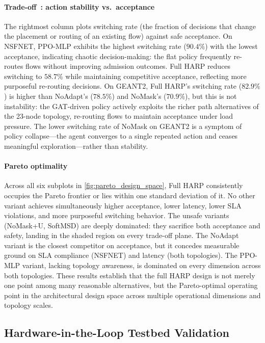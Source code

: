\documentclass[final,5p]{elsarticle}
\begin{document}
\paragraph{Trade-off~: action stability vs.\ acceptance}
The rightmost column plots switching rate (the fraction of decisions that change the placement or routing of an existing flow) against safe acceptance. On NSFNET, PPO-MLP exhibits the highest switching rate ($90.4\%$) with the lowest acceptance, indicating chaotic decision-making: the flat policy frequently re-routes flows without improving admission outcomes. Full HARP reduces switching to $58.7\%$ while maintaining competitive acceptance, reflecting more purposeful re-routing decisions. On GEANT2, Full HARP's switching rate ($82.9\%$) is higher than NoAdapt's ($78.5\%$) and NoMask's ($70.9\%$), but this is not instability: the GAT-driven policy actively exploits the richer path alternatives of the 23-node topology, re-routing flows to maintain acceptance under load pressure. The lower switching rate of NoMask on GEANT2 is a symptom of policy collapse---the agent converges to a single repeated action and ceases meaningful exploration---rather than stability.

\paragraph{Pareto optimality}
Across all six subplots in \autoref{fig:pareto_design_space}, Full HARP consistently occupies the Pareto frontier or lies within one standard deviation of it. No other variant achieves simultaneously higher acceptance, lower latency, lower SLA violations, and more purposeful switching behavior. The unsafe variants (NoMask+U, SoftMSD) are deeply dominated: they sacrifice both acceptance and safety, landing in the shaded region on every trade-off plane. The NoAdapt variant is the closest competitor on acceptance, but it concedes measurable ground on SLA compliance (NSFNET) and latency (both topologies). The PPO-MLP variant, lacking topology awareness, is dominated on every dimension across both topologies. These results establish that the full HARP design is not merely one point among many reasonable alternatives, but the Pareto-optimal operating point in the architectural design space across multiple operational dimensions and topology scales.

\subsection{Hardware-in-the-Loop Testbed Validation}
\label{subsec:testbed_validation}
\end{document}
